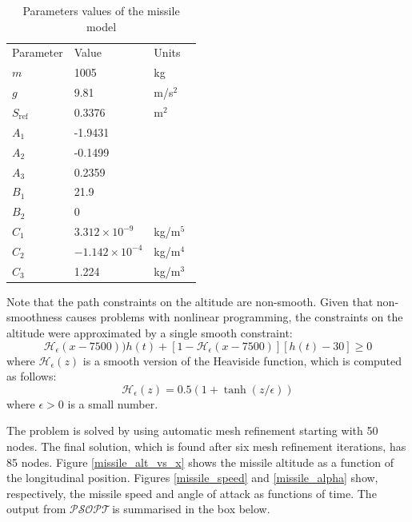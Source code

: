 \documentclass[a4paper,11pt]{report}    %
\newcommand{\psopt}{$\mathcal{PSOPT}$\,}  %
\newenvironment{shadedframe}{%
  \def\FrameCommand{\fcolorbox{black}{shadecolor}}%
  \MakeFramed {\FrameRestore}}
{\endMakeFramed}
\begin{document}
\begin{table} 
\caption{Parameters values of the missile model} \label{tab:missile_param}
\begin{center}
\begin{tabular}{lll}
Parameter & Value  & Units \\
$m$         & 1005   & kg \\
$g$         & 9.81   &m/s$^2$ \\
$S_{\mathrm{ref}}$ & 0.3376 &  m$^2$ \\
$A_1$ & -1.9431 \\
$A_2$ & -0.1499 \\
$A_3$ & 0.2359 \\
$B_1$ & 21.9 \\
$B_2$ &  0 \\
$C_1$ & $3.312 \times 10^{-9}$ & kg/m$^5$\\
$C_2$ & $-1.142 \times 10^{-4}$ & kg/m$^4$\\
$C_3$ & 1.224 & kg/m$^3$\


\end{tabular}
\end{center}
\end{table}

Note that the path constraints on the altitude are non-smooth.
Given that non-smoothness causes problems with nonlinear programming, the constraints on the altitude
were approximated by a single smooth constraint:
\[
   \mathcal{H}_\epsilon(x-7500)) h(t) +   [1-\mathcal{H}_\epsilon(x-7500)] [h(t)-30] \ge 0
\]
where $\mathcal{H}_\epsilon(z)$ is a smooth version of the Heaviside function, which
is computed as follows:
\[
    \mathcal{H}_\epsilon(z) =  0.5( 1 + \tanh(z/\epsilon) )
\]
where $\epsilon>0$ is a small number.

The problem is solved by using automatic mesh refinement starting with 50 nodes. The final
solution, which is found after six mesh refinement iterations, has 85 nodes. Figure \ref{missile_alt_vs_x} 
shows the missile altitude as a function of the longitudinal position.
Figures \ref{missile_speed} and \ref{missile_alpha} 
show, respectively, the missile speed and angle of attack as functions  of time.
The output from \psopt is summarised in the box below.


\begin{shadedframe}

\end{shadedframe}
\end{document}
